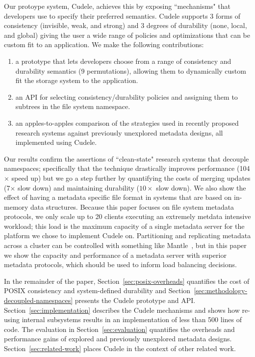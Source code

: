 Our protoype system, Cudele, achieves this by exposing ``mechanisms" that
developers use to specify their preferred semantics.  Cudele supports 3 forms
of consistency (invisible, weak, and strong) and 3 degrees of durability (none,
local, and global) giving the user a wide range of policies and optimizations
that can be custom fit to an application. We make the following contributions:

\begin{enumerate}

  \item a prototype that lets developers choose from a range of
  consistency and durability semantics (9 permutations), allowing them to dynamically custom
  fit the storage system to the application.

  \item an API for selecting consistency/durability policies and assigning
  them to subtrees in the file system namespace.

  \item an apples-to-apples comparison of the strategies used in recently proposed research systems against
  previously unexplored metadata designs, all implemented using Cudele.

\end{enumerate}

Our results confirm the assertions of ``clean-state" research systems that
decouple namespaces; specifically that the technique drastically improves
performance (104\(\times\) speed up) but we go a step further by quantifying
the costs of merging updates (7\(\times\) slow down) and maintaining durability
(\(10\times\) slow down). We also show the effect of having a metadata specific
file format in systems that are based on in-memory data structures. Because
this paper focuses on file system metadata protocols, we only scale up to 20
clients executing an extremely metdata intensive workload; this load is the
maximum capacity of a single metadata server for the platform we chose to
implement Cudele on.  Partitioning and replicating metadata across a cluster
can be controlled with something like Mantle~\cite{sevilla:sc15-mantle}, but in
this paper we show the capacity and performance of a metadata server with
superior metadata protocols, which should be used to inform load balancing
decisions.

In the remainder of the paper, Section~\ref{sec:posix-overheads} quantifies the
cost of POSIX consistency and system-defined durability and
Section~\ref{sec:methodology-decoupled-namespaces} presents the Cudele
prototype and API. Section~\ref{sec:implementation} describes the Cudele
mechanisms and shows how re-using internal subsystems results in an
implementation of less than 500 lines of code. The evaluation in
Section~\ref{sec:evaluation} quantifies the overheads and performance gains of
explored and previously unexplored metadata designs.
Section~\ref{sec:related-work} places Cudele in the context of other related
work.

